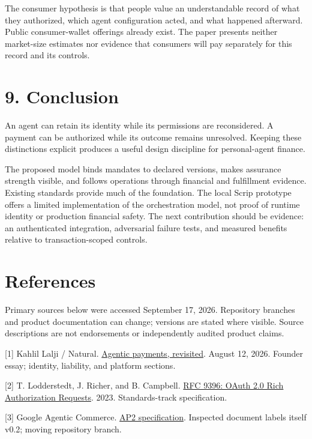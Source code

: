 \documentclass[
  11pt,
  letterpaper,
]{article}
\begin{document}
The consumer hypothesis is that people value an understandable record of
what they authorized, which agent configuration acted, and what happened
afterward. Public consumer-wallet offerings already exist. The paper
presents neither market-size estimates nor evidence that consumers will
pay separately for this record and its controls.

\section{9. Conclusion}\label{conclusion}

An agent can retain its identity while its permissions are reconsidered.
A payment can be authorized while its outcome remains unresolved.
Keeping these distinctions explicit produces a useful design discipline
for personal-agent finance.

The proposed model binds mandates to declared versions, makes assurance
strength visible, and follows operations through financial and
fulfillment evidence. Existing standards provide much of the foundation.
The local Scrip prototype offers a limited implementation of the
orchestration model, not proof of runtime identity or production
financial safety. The next contribution should be evidence: an
authenticated integration, adversarial failure tests, and measured
benefits relative to transaction-scoped controls.

\section{References}\label{references}

Primary sources below were accessed September 17, 2026. Repository
branches and product documentation can change; versions are stated where
visible. Source descriptions are not endorsements or independently
audited product claims.

{[}1{]} Kahlil Lalji / Natural.
\href{https://www.natural.com/blog/agentic-payments-revisited}{Agentic
payments, revisited}. August 12, 2026. Founder essay; identity,
liability, and platform sections.

{[}2{]} T. Lodderstedt, J. Richer, and B. Campbell.
\href{https://www.rfc-editor.org/rfc/rfc9396}{RFC 9396: OAuth 2.0 Rich
Authorization Requests}. 2023. Standards-track specification.

{[}3{]} Google Agentic Commerce.
\href{https://github.com/google-agentic-commerce/AP2/blob/main/docs/ap2/specification.md}{AP2
specification}. Inspected document labels itself v0.2; moving repository
branch.
\end{document}
